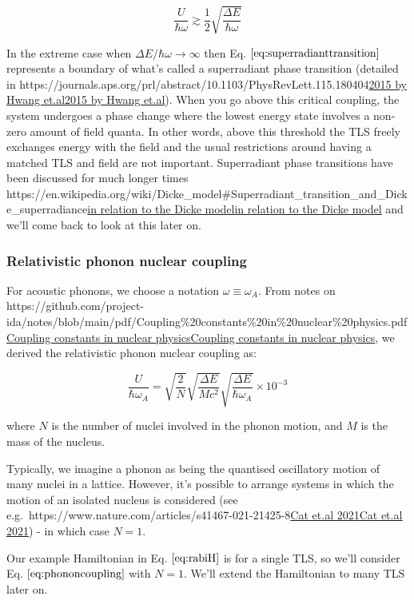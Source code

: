 \documentclass[
]{article}
\let\oldhref\href
\renewcommand{\href}[2]{\ifx#1\urlprefix\oldhref{#1}{#2}\else\uline{\oldhref{#1}{#2}}\fi}
\renewcommand{\[}{\begin{equation}}
\renewcommand{\]}{\end{equation}}
\begin{document}
\[
\frac{U}{\hbar\omega} \gtrsim \frac{1}{2}\sqrt{\frac{\Delta E}{\hbar\omega}}
\label{eq:superradianttransition}
\]

In the extreme case when \(\Delta E/\hbar\omega \rightarrow \infty\)
then Eq. \(\ref{eq:superradianttransition}\) represents a boundary of
what's called a superradiant phase transition (detailed in
\href{https://journals.aps.org/prl/abstract/10.1103/PhysRevLett.115.180404}{2015
by Hwang et.al}). When you go above this critical coupling, the system
undergoes a phase change where the lowest energy state involves a
non-zero amount of field quanta. In other words, above this threshold
the TLS freely exchanges energy with the field and the usual
restrictions around having a matched TLS and field are not important.
Superradiant phase transitions have been discussed for much longer times
\href{https://en.wikipedia.org/wiki/Dicke_model\#Superradiant_transition_and_Dicke_superradiance}{in
relation to the Dicke model} and we'll come back to look at this later
on.

\subsubsection{Relativistic phonon nuclear
coupling}\label{relativistic-phonon-nuclear-coupling}

For acoustic phonons, we choose a notation \(\omega \equiv \omega_A\).
From notes on
\href{https://github.com/project-ida/notes/blob/main/pdf/Coupling\%20constants\%20in\%20nuclear\%20physics.pdf}{Coupling
constants in nuclear physics}, we derived the relativistic phonon
nuclear coupling as:

\[
\frac{U}{\hbar \omega_A} = \sqrt{\frac{2}{N}} \sqrt{\frac{\Delta E}{M c^2}} \sqrt{\frac{\Delta E}{\hbar \omega_A}} \times 10^{-3}
\label{eq:phononcoupling}
\]

where \(N\) is the number of nuclei involved in the phonon motion, and
\(M\) is the mass of the nucleus.

Typically, we imagine a phonon as being the quantised oscillatory motion
of many nuclei in a lattice. However, it's possible to arrange systems
in which the motion of an isolated nucleus is considered (see
e.g.~\href{https://www.nature.com/articles/s41467-021-21425-8}{Cat et.al
2021}) - in which case \(N=1\).

Our example Hamiltonian in Eq. \(\ref{eq:rabiH}\) is for a single TLS,
so we'll consider Eq. \(\ref{eq:phononcoupling}\) with \(N=1\). We'll
extend the Hamiltonian to many TLS later on.
\end{document}
